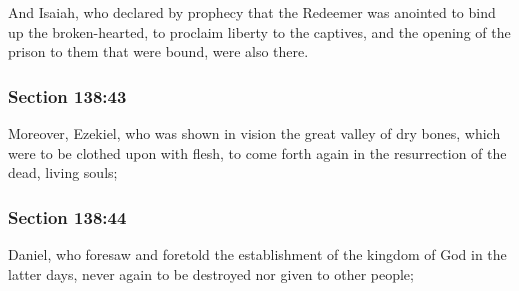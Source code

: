 		And Isaiah, who declared by prophecy that the Redeemer was anointed to bind up the broken-hearted, to proclaim liberty to the captives, and the opening of the prison to them that were bound, were also there.


	\subsubsection{Section 138:43} %
		\label{DC138-43}

		Moreover, Ezekiel, who was shown in vision the great valley of dry bones, which were to be clothed upon with flesh, to come forth again in the resurrection of the dead, living souls;


	\subsubsection{Section 138:44} %
		\label{DC138-44}

		Daniel, who foresaw and foretold the establishment of the kingdom of God in the latter days, never again to be destroyed nor given to other people;


